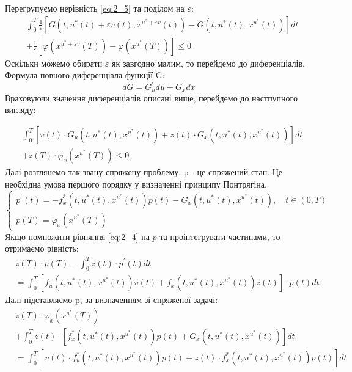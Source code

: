\documentclass[a4paper,12pt]{extreport}
\begin{document}
    Перегрупуємо нерівність \ref{eq:2_5} та поділом на $\varepsilon$:
    $$
    \begin{aligned}
    &\int_0^T \frac{1}{\varepsilon}\left[G\left(t, u^*(t)+\varepsilon v(t), x^{u^*+\varepsilon v}(t)\right)-G\left(t, u^*(t), x^{u^*}(t)\right)\right] d t \\
    &+\frac{1}{\varepsilon}\left[\varphi\left(x^{u^*+\varepsilon v}(T)\right)-\varphi\left(x^{u^*}(T)\right)\right] \leq 0
    \end{aligned}
    $$
    Оскільки можемо обирати $\varepsilon$ як завгодно малим, то перейдемо до диференціалів. Формула повного диференціала функції G:
    $$
    d G=G_u^{\prime} d u+G_x^{\prime} d x
    $$
    Враховуючи значення диференціалів описані вище, перейдемо до настпупного вигляду:

    $$
    \begin{aligned}
    &\int_0^T\left[v(t) \cdot G_u\left(t, u^*(t), x^{u^*}(t)\right)+z(t) \cdot G_x\left(t, u^*(t), x^{u^*}(t)\right)\right] d t \\
    &+z(T) \cdot \varphi_x\left(x^{u^*}(T)\right) \leq 0
    \end{aligned}
    $$
    Далі розглянемо так звану спряжену проблему. p - це спряжений стан. Це необхідна умова першого порядку у визначенні принципу Понтрягіна.
    \begin{equation} \label{eq:2_6}
    \left\{\begin{array}{l}
    p^{\prime}(t)=-f_x^*\left(t, u^*(t), x^{u^*}(t)\right) p(t)-G_x\left(t, u^*(t), x^{u^*}(t)\right), \quad t \in(0, T) \\
    p(T)=\varphi_x\left(x^{u^*}(T)\right)
    \end{array}\right.
    \end{equation}
    Якщо помножити рівняння \ref{eq:2_4} на $p$ та проінтегрувати частинами, то отримаємо рівність:
    $$
    \begin{aligned}
    &z(T) \cdot p(T)-\int_0^T z(t) \cdot p^{\prime}(t) d t \\
    &=\int_0^T\left[f_u\left(t, u^*(t), x^{u^*}(t)\right) v(t)+f_x\left(t, u^*(t), x^{u^*}(t)\right) z(t)\right] \cdot p(t) d t
    \end{aligned}
    $$
    Далі підставляємо p, за визначенням зі спряженої задачі:
    \begin{equation} \label{eq:2_7}
    \begin{aligned}
    &z(T) \cdot \varphi_x\left(x^{u^*}(T)\right) \\
    &+\int_0^T z(t) \cdot\left[f_x^*\left(t, u^*(t), x^{u^*}(t)\right) p(t)+G_x\left(t, u^*(t), x^{u^*}(t)\right)\right] d t \\
    &=\int_0^T\left[v(t) \cdot f_u^*\left(t, u^*(t), x^{u^*}(t)\right) p(t)+z(t) \cdot f_x^*\left(t, u^*(t), x^{u^*}(t)\right) p(t)\right] d t
    \end{aligned}
\end{equation}
\end{document}
